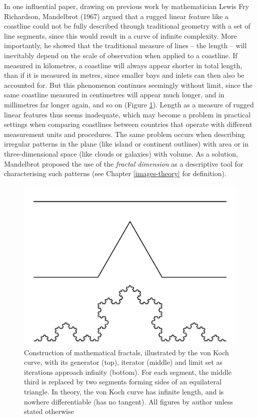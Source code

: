 \documentclass[
  12pt,
  a4paper, twoside]{book}
\begin{document}
In one influential paper, drawing on previous work by mathematician Lewis Fry Richardson, Mandelbrot (1967) argued that a rugged linear feature like a coastline could not be fully described through traditional geometry with a set of line segments, since this would result in a curve of infinite complexity. More importantly, he showed that the traditional measure of lines -- the length -- will inevitably depend on the scale of observation when applied to a coastline. If measured in kilometres, a coastline will always appear shorter in total length, than if it is measured in metres, since smaller bays and inlets can then also be accounted for. But this phenomenon continues seemingly without limit, since the same coastline measured in centimetres will appear much longer, and in millimetres far longer again, and so on (Figure \ref{fig:02-koch}). Length as a measure of rugged linear features thus seems inadequate, which may become a problem in practical settings when comparing coastlines between countries that operate with different measurement units and procedures. The same problem occurs when describing irregular patterns in the plane (like island or continent outlines) with area or in three-dimensional space (like clouds or galaxies) with volume. As a solution, Mandelbrot proposed the use of the \emph{fractal dimension} as a descriptive tool for characterising such patterns (see Chapter \ref{images-theory} for definition).



\begin{figure}

{\centering \includegraphics[width=0.9\linewidth]{bookdown-demo_files/figure-latex/02-koch-1} 

}

\caption[The von Koch curve]{Construction of mathematical fractals, illustrated by the von Koch curve, with its generator (top), iterator (middle) and limit set as iterations approach infinity (bottom). For each segment, the middle third is replaced by two segments forming sides of an equilateral triangle. In theory, the von Koch curve has infinite length, and is nowhere differentiable (has no tangent). All figures by author unless stated otherwise}\label{fig:02-koch}
\end{figure}
\end{document}
